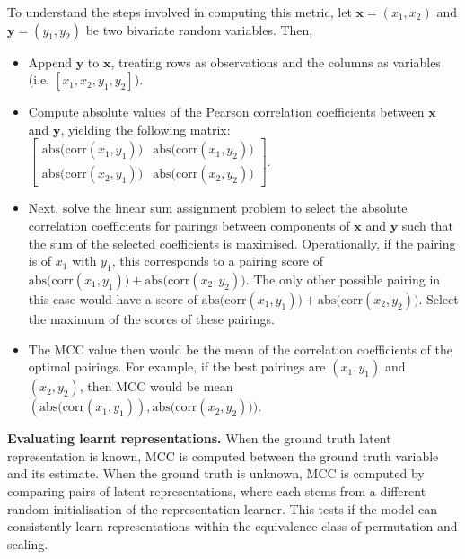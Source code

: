 \documentclass{article}
\newcommand{\x}{\mathbf{x}}
\begin{document}
To understand the steps involved in computing this metric, let $\x  = (x_1, x_2)$ and $\mathbf{y} = (y_1, y_2)$ be two bivariate random variables. Then,
\noindent
\begin{itemize}
    \item Append $\mathbf{y}$ to $\x$, treating rows as observations and the columns as variables (i.e. $[x_1, x_2, y_1, y_2 ]$).
    \item Compute absolute values of the Pearson correlation coefficients between $\x$ and $\mathbf{y}$, yielding the following matrix: 
    $\begin{bmatrix}
        \text{abs(corr}(x_1, y_1)) & \text{abs(corr}(x_1, y_2))\\
        \text{abs(corr}(x_2, y_1)) & \text{abs(corr}(x_2, y_2))
    \end{bmatrix}$.
    \item Next, solve the linear sum assignment problem to select the absolute correlation coefficients for pairings between components of $\x$ and $\mathbf{y}$ such that the sum of the selected coefficients is maximised. Operationally, if the pairing is of $x_1$ with $y_1$, this corresponds to a pairing score of $\text{abs(corr}(x_1, y_1)) + \text{abs(corr}(x_2, y_2))$. The only other possible pairing in this case would have a score of $\text{abs(corr}(x_1, y_1)) + \text{abs(corr}(x_2, y_2))$. Select the maximum of the scores of these pairings.
    \item The MCC value then would be the mean of the correlation coefficients of the optimal pairings. For example, if the best pairings are $(x_1, y_1)$ and $(x_2, y_2)$, then MCC would be mean$(\text{abs(corr}(x_1, y_1)), \text{abs(corr}(x_2, y_2)))$.
\end{itemize}

\textbf{Evaluating learnt representations.} When the ground truth latent representation is known, MCC is computed between the ground truth variable and its estimate. When the ground truth is unknown, MCC is computed by comparing pairs of latent representations, where each stems from a different random initialisation of the representation learner. This tests if the model can consistently learn representations within the equivalence class of permutation and scaling.
\end{document}
